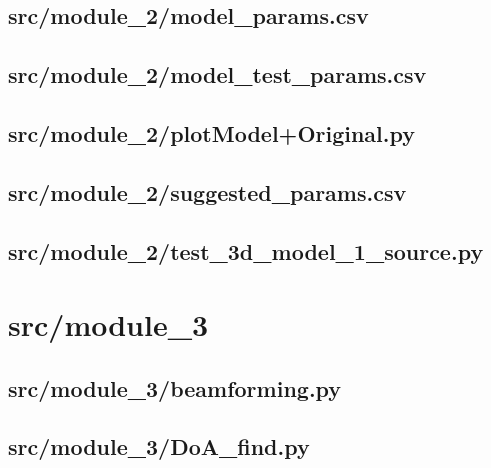 \subsection*{src/module\_2/model\_params.csv}
\label{ap:model_params}

\subsection*{src/module\_2/model\_test\_params.csv}
\label{ap:model_test_params}

\subsection*{src/module\_2/plotModel+Original.py}
\label{ap:plotModel_Original}

\subsection*{src/module\_2/suggested\_params.csv}
\label{ap:suggested_params}

\subsection*{src/module\_2/test\_3d\_model\_1\_source.py}
\label{ap:test_3d_model_1_source}
\section{src/module\_3}

\subsection*{src/module\_3/beamforming.py}
\label{ap:beamforming}

\subsection*{src/module\_3/DoA\_find.py}
\label{ap:DoA_find}

